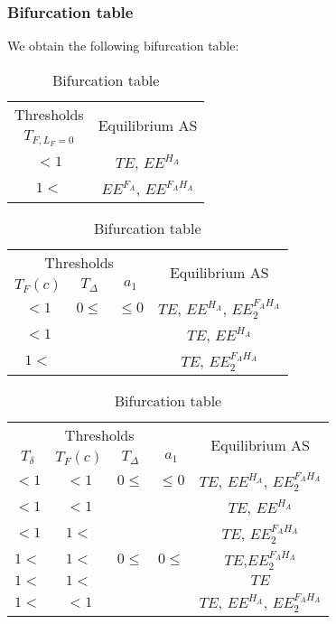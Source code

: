 \documentclass{article}
\begin{document}
\subsubsection{Bifurcation table}

We obtain the following bifurcation table:
\begin{table}[!ht]
\centering
\caption{Bifurcation table}
\begin{minipage}[c]{0.45\linewidth}
\centering
{}
\begin{tabular}{c|c}
Thresholds & \multirow{2}{*}{Equilibrium AS}\\
$T_{F, L_F = 0}$  &\\
 \hline
$ < 1$ & $TE$, $EE^{H_A}$\\
\hline
$1 < $ &  $EE^{F_A}$, $EE^{F_AH_A}$
\end{tabular}
\end{minipage}
\centering
\begin{minipage}[c]{0.45\linewidth}
\centering
{}
\begin{tabular}{c|c|c|c}
\multicolumn{3}{c|}{Thresholds} & \multirow{2}{*}{Equilibrium AS}\\
$T_{F}(c)$ & $T_\Delta$& $a_1$ &\\
 \hline
$ < 1$ & $0 \leq $ & $\leq 0$ &$TE$, $EE^{H_A}$, $EE^{F_AH_A}_2$\\
\hline
$ < 1$ & & & $TE$, $EE^{H_A}$\\
\hline
$1 < $ &  & & $TE$, $EE^{F_AH_A}_2$
\end{tabular}
\end{minipage}

\centering
\begin{minipage}[c]{0.45\linewidth}
\centering
{}
\begin{tabular}{c|c|c|c|c}
\multicolumn{4}{c|}{Thresholds} & \multirow{2}{*}{Equilibrium AS}\\
$T_\delta$ & $T_{F}(c)$ & $T_\Delta$ & $a_1$ &\\
 \hline
$<1$ & $<1$ & $ 0 \leq $ & $ \leq 0 $ &$TE$, $EE^{H_A}$, $EE^{F_AH_A}_2$\\
\hline
$<1$ & $<1$ &  & &$TE$, $EE^{H_A}$\\
\hline
$<1$ & $1<$ &  & &$TE$, $EE^{F_AH_A}_2$\\
\hline
$ 1<$ & $1<$ &$ 0 \leq $ &$ 0 \leq $ &$TE$,$EE^{F_AH_A}_2$\\
\hline
$1<$ & $1<$ & & & $TE$  \\
\hline
$1<$ & $<1$ & & & $TE$, $EE^{H_A}$, $EE^{F_AH_A}_2$ 
\end{tabular}
\end{minipage}
\end{table}
\end{document}

